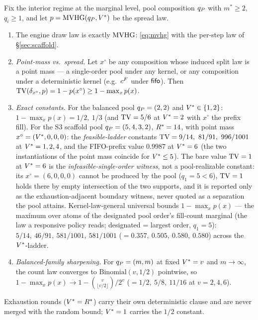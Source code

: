 \begin{lemma}
\label{lem:t1-r2a}
Fix the interior regime at the marginal level, pool composition $q_{P}$ with
$m^{*} \geq 2$, $q_i \geq 1$, and let $p = \operatorname{MVHG}(q_{P}, V^{*})$ be the spread
law.
\begin{enumerate}
\item[(i)] The engine draw law is exactly $\operatorname{MVHG}$: \eqref{eq:mvhg} with the
per-step law of \S\ref{sec:scaffold}.
\item[(ii)] \emph{Point-mass vs.\ spread.} Let $x^{\circ}$ be any
composition whose induced split law is a point mass --- a single-order pool
under any kernel, or any composition under a deterministic kernel (e.g.\
$c^{F}$ under $\mathsf{fifo}$). Then
$\operatorname{TV}(\delta_{x^{\circ}}, p) = 1 - p(x^{\circ}) \geq 1 - \max_x p(x)$.
\item[(iii)] \emph{Exact constants.} For the balanced pool $q_{P} = (2,2)$ and
$V^{*} \in \{1,2\}$: $1 - \max_x p(x) = 1/2,\ 1/3$ (and $\operatorname{TV} = 5/6$ at
$V^{*} = 2$ with $x^{\circ}$ the prefix fill). For the S3 scaffold pool
$q_{P} = (5,4,3,2)$, $R^{*} = 14$, with point mass $x^{\circ} = (V^{*},0,0,0)$:
the \emph{feasible-ladder} constants $\operatorname{TV} = 9/14,\ 81/91,\ 996/1001$ at
$V^{*} = 1,2,4$, and the FIFO-prefix value $0.9987$ at $V^{*} = 6$ (the
two instantiations of the point mass coincide for $V^{*} \leq 5$). The bare
value $\operatorname{TV} = 1$ at $V^{*} = 6$ is the \emph{infeasible-single-order
witness}, not a pool-realizable constant: its $x^{\circ} = (6,0,0,0)$ cannot
be produced by the pool ($q_1 = 5 < 6$), $\operatorname{TV} = 1$ holds there by empty
intersection of the two supports, and it is reported only as the
exhaustion-adjacent boundary witness, never quoted as a separation the pool
attains. Kernel-law-general universal bounds $1 - \max_x p(x)$ --- the
maximum over atoms of the designated pool order's fill-count marginal (the
law a responsive policy reads; designated = largest order, $q_1 = 5$):
$5/14,\ 46/91,\ 581/1001,\ 581/1001$ ($= 0.357,\ 0.505,\ 0.580,\ 0.580$)
across the $V^{*}$-ladder.
\item[(iv)] \emph{Balanced-family sharpening.} For $q_{P} = (m,m)$ at fixed
$V^{*} = v$ and $m \to \infty$, the count law converges to
$\mathrm{Binomial}(v, 1/2)$ pointwise, so $1 - \max_x p(x) \to 1 -
\binom{v}{\lfloor v/2 \rfloor}/2^{v}$ ($= 1/2,\ 5/8,\ 11/16$ at $v = 2,4,6$).
\end{enumerate}
Exhaustion rounds ($V^{*} = R^{*}$) carry their own deterministic clause
and are never merged with the random bound; $V^{*} = 1$ carries the $1/2$
constant.
\end{lemma}

